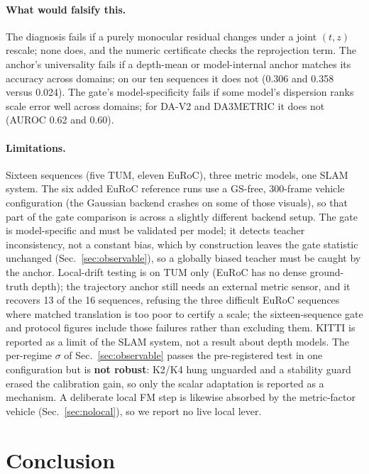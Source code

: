 \paragraph{What would falsify this.} The diagnosis fails if a purely monocular
residual changes under a joint $(t,z)$ rescale; none does, and the numeric
certificate checks the reprojection term. The anchor's universality fails if a
depth-mean or model-internal anchor matches its accuracy across domains; on our
ten sequences it does not (0.306 and 0.358 versus 0.024). The gate's
model-specificity fails if some model's dispersion ranks scale error well across
domains; for DA-V2 and DA3METRIC it does not (AUROC 0.62 and 0.60).

\paragraph{Limitations.} Sixteen sequences (five TUM, eleven EuRoC), three metric
models, one SLAM system. The six added EuRoC reference runs use a GS-free,
300-frame vehicle configuration (the Gaussian backend crashes on some of those
visuals), so that part of the gate comparison is across a slightly different
backend setup. The gate is model-specific and must be validated per model; it
detects teacher inconsistency, not a constant bias, which by construction leaves
the gate statistic unchanged (Sec.~\ref{sec:observable}), so a globally biased teacher must be
caught by the anchor. Local-drift testing is on TUM only (EuRoC has no dense
ground-truth depth); the trajectory anchor still needs an external metric sensor,
and it recovers 13 of the 16 sequences, refusing the three difficult EuRoC
sequences where matched translation is too poor to certify a scale; the
sixteen-sequence gate and protocol figures include those failures rather than
excluding them. KITTI is reported as a limit of the SLAM system, not a result
about depth models.
The per-regime $\sigma$ of Sec.~\ref{sec:observable} passes the pre-registered test in one
configuration but is \textbf{not robust}: K2/K4 hung unguarded and a stability
guard erased the calibration gain, so only the scalar adaptation is reported as a
mechanism. A deliberate local FM step is likewise absorbed by the metric-factor
vehicle (Sec.~\ref{sec:nolocal}), so we report no live local lever.

\section{Conclusion}

